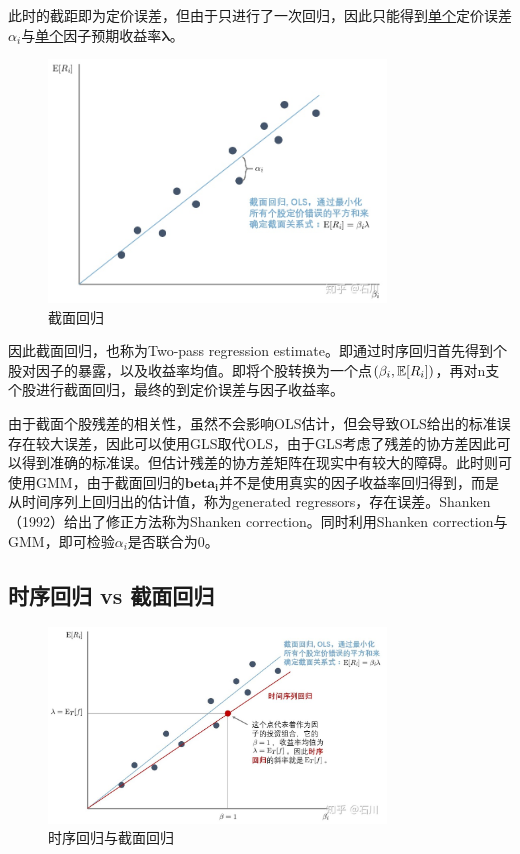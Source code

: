 \documentclass[11pt]{article}
\begin{document}
此时的截距即为定价误差，但由于只进行了一次回归，因此只能得到\uline{单个}定价误差$\alpha_i$与\uline{单个}因子预期收益率$\bm{\lambda}$。

\begin{figure}[H]
    \centering
    \includegraphics[width=0.8\textwidth]{fig/cs_reg.jpg}
    \caption{截面回归}
    \label{fig：cs_reg}
\end{figure}

因此截面回归，也称为Two-pass regression estimate。即通过时序回归首先得到个股对因子的暴露，以及收益率均值。即将个股转换为一个点$(\beta_i,\mathbb{E}[R_i])$，再对n支个股进行截面回归，最终的到定价误差与因子收益率。

由于截面个股残差的相关性，虽然不会影响OLS估计，但会导致OLS给出的标准误存在较大误差，因此可以使用GLS取代OLS，由于GLS考虑了残差的协方差因此可以得到准确的标准误。但估计残差的协方差矩阵在现实中有较大的障碍。此时则可使用GMM，由于截面回归的$\bm{beta_i}$并不是使用真实的因子收益率回归得到，而是从时间序列上回归出的估计值，称为generated regressors，存在误差。Shanken（1992）给出了修正方法称为Shanken correction。同时利用Shanken correction与GMM，即可检验$\alpha_i$是否联合为0。

\subsection{时序回归 vs 截面回归}

\begin{figure}[H]
    \centering
    \includegraphics[width=0.8\textwidth]{fig/ts_vs_cs.jpg}
    \caption{时序回归与截面回归}
    \label{fig:ts_vs_cs}
\end{figure}
\end{document}
